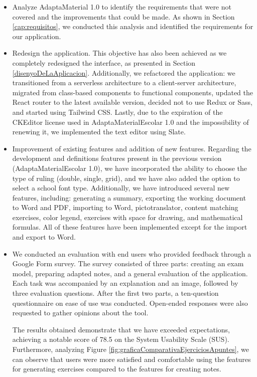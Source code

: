 \begin{itemize}
    \item Analyze AdaptaMaterial 1.0 to identify the requirements that were not covered and the improvements that could be made. As shown in Section \ref{cap:requisitos}, we conducted this analysis and identified the requirements for our application.
    \item Redesign the application. This objective has also been achieved as we completely redesigned the interface, as presented in Section \ref{disenyoDeLaAplicacion}. Additionally, we refactored the application: we transitioned from a serverless architecture to a client-server architecture, migrated from class-based components to functional components, updated the React router to the latest available version, decided not to use Redux or Sass, and started using Tailwind CSS. Lastly, due to the expiration of the CKEditor license used in AdaptaMaterialEscolar 1.0 and the impossibility of renewing it, we implemented the text editor using Slate.
    \item Improvement of existing features and addition of new features. Regarding the development and definitions features present in the previous version (AdaptaMaterialEscolar 1.0), we have incorporated the ability to choose the type of ruling (double, single, grid), and we have also added the option to select a school font type. Additionally, we have introduced several new features, including: generating a summary, exporting the working document to Word and PDF, importing to Word, pictotranslator, content matching exercises, color legend, exercises with space for drawing, and mathematical formulas. All of these features have been implemented except for the import and export to Word.
    \item We conducted an evaluation with end users who provided feedback through a Google Form survey. The survey consisted of three parts: creating an exam model, preparing adapted notes, and a general evaluation of the application. Each task was accompanied by an explanation and an image, followed by three evaluation questions. After the first two parts, a ten-question questionnaire on ease of use was conducted. Open-ended responses were also requested to gather opinions about the tool.
    
    The results obtained demonstrate that we have exceeded expectations, achieving a notable score of 78.5 on the System Usability Scale (SUS). Furthermore, analyzing Figure \ref{fig:graficaComparativaEjerciciosApuntes}, we can observe that users were more satisfied and comfortable using the features for generating exercises compared to the features for creating notes.
\end{itemize}




